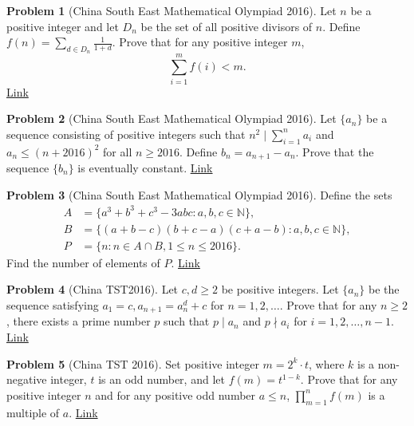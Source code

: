 \documentclass[]{article}
\theoremstyle{definition}
\newtheorem{problem}{Problem}
\begin{document}
\begin{problem}[China South East Mathematical Olympiad 2016]
	Let $n$ be a positive integer and let $D_n$ be the set of all positive divisors of $n$. Define $f(n)=\sum\limits_{d\in D_n}{\frac{1}{1+d}}$.
	Prove that for any positive integer $m$, $$\sum_{i=1}^{m}{f(i)} <m.$$
	\flushright \href{http://artofproblemsolving.com/community/c6h1281358p6741745}{Link}
\end{problem}



\begin{problem}[China South East Mathematical Olympiad 2016]
	Let $\{ a_n\}$ be a sequence consisting of positive integers such that $n^2 \mid \sum_{i=1}^{n}{a_i}$ and $a_n\leq (n+2016)^2$ for all $n\geq 2016$.
	Define $b_n=a_{n+1}-a_n$. Prove that the sequence $\{ b_n\}$ is eventually constant. \hfill \href{http://artofproblemsolving.com/community/c6h1281364p6741764}{Link}
\end{problem}



\begin{problem}[China South East Mathematical Olympiad 2016]
	Define the sets 
	\begin{align*}
	A &=\{a^3+b^3+c^3-3abc:a,b,c\in\mathbb{N}\}, \\
	B &=\{(a+b-c)(b+c-a)(c+a-b):a,b,c\in\mathbb{N}\},\\
	P &=\{n:n\in A\cap B,1\le n\le 2016\}.
	\end{align*}
	Find the number of elements of $P$. \href{http://artofproblemsolving.com/community/c6h1285319p6774603}{Link}
\end{problem}



\begin{problem}[China TST‌2016]
	Let $c,d \geq 2$ be positive integers. Let $\{a_n\}$ be the sequence satisfying $a_1 = c, a_{n+1} = a_n^d + c$ for $n = 1,2,\dots$.
	Prove that for any $n \geq 2$, there exists a prime number $p$ such that $p\mid a_n$ and $p \nmid a_i$ for $i = 1,2,\dots, n-1$. \hfill \href{http://artofproblemsolving.com/community/c6h1212540p6016827}{Link}
\end{problem}



\begin{problem}[China TST 2016]
	Set positive integer $m=2^k\cdot t$, where $k$ is a non-negative integer, $t$ is an odd number, and let $f(m)=t^{1-k}$. Prove that for any positive integer $n$ and for any positive odd number $a\le n$, $\prod_{m=1}^n f(m)$ is a multiple of $a$. \hfill \href{http://artofproblemsolving.com/community/c6h1215111p6043322}{Link}
\end{problem}
\end{document}
